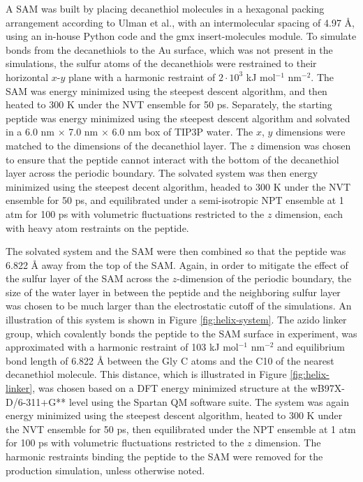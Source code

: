 A SAM was built by placing decanethiol molecules in a hexagonal packing arrangement according to Ulman et al.\cite{Ulman1989}, with an intermolecular spacing of 4.97 \si{\angstrom}, using an in-house Python code and the gmx insert-molecules module. 
To simulate bonds from the decanethiols to the Au surface, which was not present in the simulations, the sulfur atoms of the decanethiols were restrained to their horizontal $x$-$y$ plane with a harmonic restraint of $2\cdot10^3$ kJ mol$^{-1}$ nm$^{-2}$. 
The SAM was energy minimized using the steepest descent algorithm, and then heated to 300 K under the NVT ensemble for 50 ps. 
Separately, the starting peptide was energy minimized using the steepest descent algorithm and solvated in a 6.0 nm $\times$ 7.0 nm $\times$ 6.0 nm box of TIP3P water. 
The $x$, $y$ dimensions were matched to the dimensions of the decanethiol layer. 
The $z$ dimension was chosen to ensure that the peptide cannot interact with the bottom of the decanethiol layer across the periodic boundary. 
The solvated system was then energy minimized using the steepest decent algorithm, headed to 300 K under the NVT ensemble for 50 ps, and equilibrated under a semi-isotropic NPT ensemble at 1 atm for 100 ps with volumetric fluctuations restricted to the $z$ dimension, each with heavy atom restraints on the peptide. 

The solvated system and the SAM were then combined so that the peptide was 6.822 \si{\angstrom} away from the top of the SAM. 
Again, in order to mitigate the effect of the sulfur layer of the SAM across the $z$-dimension of the periodic boundary, the size of the water layer in between the peptide and the neighboring sulfur layer was chosen to be much larger than the electrostatic cutoff of the simulations. 
An illustration of this system is shown in Figure \ref{fig:helix-system}. 
The azido linker group, which covalently bonds the peptide to the SAM surface in experiment, was approximated with a harmonic restraint of 103 kJ mol$^{-1}$ nm$^{-2}$ and equilibrium bond length of 6.822 \si{\angstrom} between the Gly C\textalpha{} atoms and the C10 of the nearest decanethiol molecule. 
This distance, which is illustrated in Figure \ref{fig:helix-linker}, was chosen based on a DFT energy minimized structure at the wB97X-D/6-311$+$G** level using the Spartan QM software suite\cite{Shao2006}.   
The system was again energy minimized using the steepest descent algorithm, heated to 300 K under the NVT ensemble for 50 ps, then equilibrated under the NPT ensemble at 1 atm for 100 ps with volumetric fluctuations restricted to the $z$ dimension. 
The harmonic restraints binding the peptide to the SAM were removed for the production simulation, unless otherwise noted.

